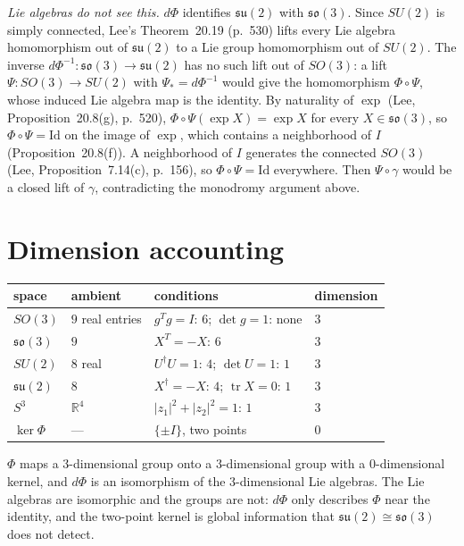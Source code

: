 \emph{Lie algebras do not see this.} $d\Phi$ identifies $\mathfrak{su}(2)$ with
$\mathfrak{so}(3)$. Since $SU(2)$ is simply connected, Lee's Theorem~20.19
(p.~530) lifts every Lie algebra homomorphism out of $\mathfrak{su}(2)$ to a
Lie group homomorphism out of $SU(2)$. The inverse $d\Phi^{-1}\colon
\mathfrak{so}(3)\to\mathfrak{su}(2)$ has no such lift out of $SO(3)$: a lift
$\Psi\colon SO(3)\to SU(2)$ with $\Psi_*=d\Phi^{-1}$ would give the
homomorphism $\Phi\circ\Psi$, whose induced Lie algebra map is the identity.
By naturality of $\exp$ (Lee, Proposition~20.8(g), p.~520),
$\Phi\circ\Psi(\exp X)=\exp X$ for every $X\in\mathfrak{so}(3)$, so
$\Phi\circ\Psi=\mathrm{Id}$ on the image of $\exp$, which contains a
neighborhood of $I$ (Proposition~20.8(f)). A neighborhood of $I$ generates the
connected $SO(3)$ (Lee, Proposition~7.14(c), p.~156), so
$\Phi\circ\Psi=\mathrm{Id}$ everywhere. Then
$\Psi\circ\gamma$ would be a closed lift of $\gamma$, contradicting the
monodromy argument above.

\section{Dimension accounting}\label{quat:sec:dimensions}
\begin{center}
\small
\begin{tabular}{llll}
 space & ambient & conditions & dimension\\\hline
 $SO(3)$ & $9$ real entries & $g^Tg=I$: $6$; $\det g=1$: none & $3$\\
 $\mathfrak{so}(3)$ & $9$ & $X^T=-X$: $6$ & $3$\\
 $SU(2)$ & $8$ real & $U^\dagger U=1$: $4$; $\det U=1$: $1$ & $3$\\
 $\mathfrak{su}(2)$ & $8$ & $X^\dagger=-X$: $4$; $\operatorname{tr}X=0$: $1$ & $3$\\
 $S^3$ & $\mathbb R^4$ & $|z_1|^2+|z_2|^2=1$: $1$ & $3$\\
 $\ker\Phi$ & --- & $\{\pm I\}$, two points & $0$
\end{tabular}
\end{center}
$\Phi$ maps a $3$-dimensional group onto a $3$-dimensional group with a
$0$-dimensional kernel, and $d\Phi$ is an isomorphism of the
$3$-dimensional Lie algebras. The Lie algebras are isomorphic and the groups
are not: $d\Phi$ only describes $\Phi$ near the identity, and the two-point
kernel is global information that $\mathfrak{su}(2)\cong\mathfrak{so}(3)$ does
not detect.
